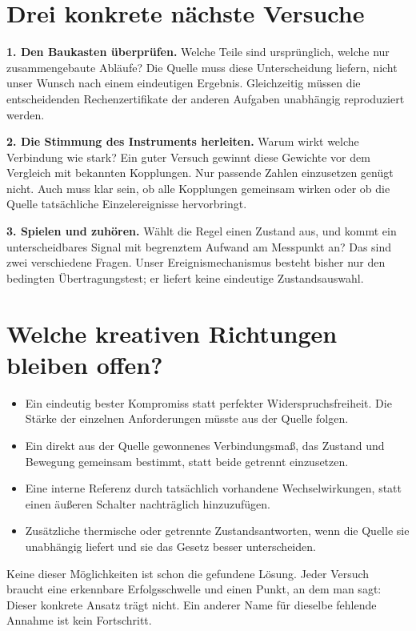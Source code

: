 \documentclass[10pt,a4paper]{article}
\begin{document}
\clearpage
\section*{Drei konkrete nächste Versuche}
\textbf{1. Den Baukasten überprüfen.}
Welche Teile sind ursprünglich, welche nur zusammengebaute Abläufe?
Die Quelle muss diese Unterscheidung liefern, nicht unser Wunsch nach
einem eindeutigen Ergebnis. Gleichzeitig müssen die entscheidenden
Rechenzertifikate der anderen Aufgaben unabhängig reproduziert werden.

\textbf{2. Die Stimmung des Instruments herleiten.}
Warum wirkt welche Verbindung wie stark? Ein guter Versuch gewinnt diese
Gewichte vor dem Vergleich mit bekannten Kopplungen. Nur passende Zahlen
einzusetzen genügt nicht. Auch muss klar sein, ob alle Kopplungen gemeinsam
wirken oder ob die Quelle tatsächliche Einzelereignisse hervorbringt.

\textbf{3. Spielen und zuhören.}
Wählt die Regel einen Zustand aus, und kommt ein unterscheidbares Signal
mit begrenztem Aufwand am Messpunkt an? Das sind zwei verschiedene Fragen.
Unser Ereignismechanismus besteht bisher nur den bedingten Übertragungstest;
er liefert keine eindeutige Zustandsauswahl.

\section*{Welche kreativen Richtungen bleiben offen?}
\begin{itemize}
\item Ein eindeutig bester Kompromiss statt perfekter Widerspruchsfreiheit.
Die Stärke der einzelnen Anforderungen müsste aus der Quelle folgen.
\item Ein direkt aus der Quelle gewonnenes Verbindungsmaß, das Zustand
und Bewegung gemeinsam bestimmt, statt beide getrennt einzusetzen.
\item Eine interne Referenz durch tatsächlich vorhandene Wechselwirkungen,
statt einen äußeren Schalter nachträglich hinzuzufügen.
\item Zusätzliche thermische oder getrennte Zustandsantworten, wenn die
Quelle sie unabhängig liefert und sie das Gesetz besser unterscheiden.
\end{itemize}
Keine dieser Möglichkeiten ist schon die gefundene Lösung. Jeder Versuch
braucht eine erkennbare Erfolgsschwelle und einen Punkt, an dem man sagt:
Dieser konkrete Ansatz trägt nicht. Ein anderer Name für dieselbe fehlende
Annahme ist kein Fortschritt.
\end{document}
